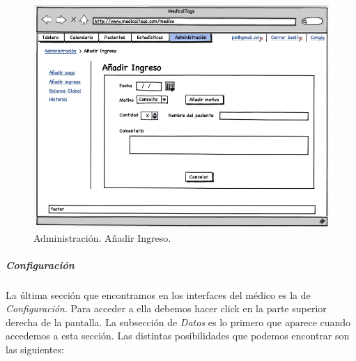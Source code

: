 		\begin{figure}[H]
		  \centering
		    \includegraphics[width=12cm]{img/png/interfaz/22_Administracion_Medico1.png}
		  \caption{Administración. Añadir Ingreso.}
		  \label{fig:iu_administracion_ingreso}
		\end{figure}
				
		
		\subparagraph{Configuración} %
		\label{par:medico_configuracion}
		
		La última sección que encontramos en los interfaces del médico es la de \textit{Configuración}. Para acceder a ella debemos hacer click en la parte superior derecha de la pantalla. La subsección de \textit{Datos} es lo primero que aparece cuando accedemos a esta sección. Las distintas posibilidades que podemos encontrar son las siguientes:
		
